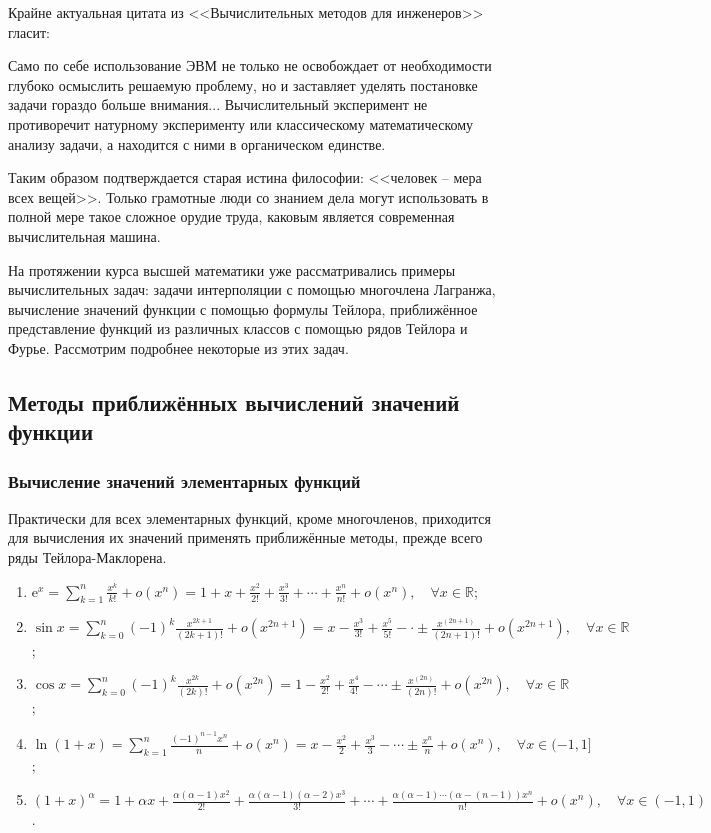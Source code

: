 \documentclass[12pt, a4paper]{article}
\begin{document}
Крайне актуальная цитата из <<Вычислительных методов для инженеров>> гласит:
\begin{displayquote}
Само по себе использование ЭВМ не только не освобождает от необходимости глубоко осмыслить решаемую проблему, но и заставляет уделять постановке задачи гораздо больше внимания... Вычислительный эксперимент не противоречит натурному эксперименту или классическому математическому анализу задачи, а находится с ними в органическом единстве.
\end{displayquote}

Таким образом подтверждается старая истина философии: <<человек -- мера всех вещей>>. Только грамотные люди со знанием дела могут использовать в полной мере такое сложное орудие труда, каковым является современная вычислительная машина.

На протяжении курса высшей математики уже рассматривались примеры вычислительных задач: задачи интерполяции с помощью многочлена Лагранжа, вычисление значений функции с помощью формулы Тейлора, приближённое представление
функций из различных классов с помощью рядов Тейлора и Фурье. Рассмотрим подробнее некоторые из этих задач.

\subsection{Методы приближённых вычислений значений функции}

\subsubsection{Вычисление значений элементарных функций}

Практически для всех элементарных функций, кроме многочленов, приходится для вычисления их значений применять приближённые методы, прежде всего ряды Тейлора-Маклорена.

\begin{enumerate}
 \item $\mathrm{e}^x = \sum \limits_{k=1}^n \frac{x^k}{k!} + o(x^n) = 1 + x + \frac{x^2}{2!} + \frac{x^3}{3!} + \cdots + \frac{x^n}{n!} + o(x^n), \quad \forall x \in \mathbb{R}$;
 \item $\sin x = \sum \limits_{k=0}^n (-1)^k \frac{x^{2k+1}}{(2k+1)!} + o(x^{2n+1}) = x - \frac{x^3}{3!} + \frac{x^5}{5!} - \cdot \pm \frac{x^{(2n+1)}}{(2n+1)!} + o(x^{2n+1}), \quad \forall x \in \mathbb{R}$;
 \item $\cos x = \sum \limits_{k=0}^n (-1)^k \frac{x^{2k}}{(2k)!} + o(x^{2n}) = 1 - \frac{x^2}{2!} + \frac{x^4}{4!} - \cdots \pm \frac{x^{(2n)}}{(2n)!} + o(x^{2n}), \quad \forall x \in \mathbb{R}$;
 \item $\ln (1+x) = \sum \limits_{k=1}^n \frac{(-1)^{n-1}x^n}{n} + o(x^n) = x - \frac{x^2}{2} + \frac{x^3}{3} - \cdots \pm \frac{x^n}{n} + o(x^n), \quad \forall x \in (-1, 1]$;
 \item $(1+x)^{\alpha} = 1+\alpha x + \frac{\alpha (\alpha - 1)x^2}{2!} + \frac{\alpha (\alpha - 1)(\alpha - 2)x^3}{3!} + \cdots + \frac{\alpha (\alpha - 1) \cdots (\alpha - (n-1))x^n}{n!} + o(x^n), \quad \forall x \in (-1, 1)$.
\end{enumerate}
\end{document}
